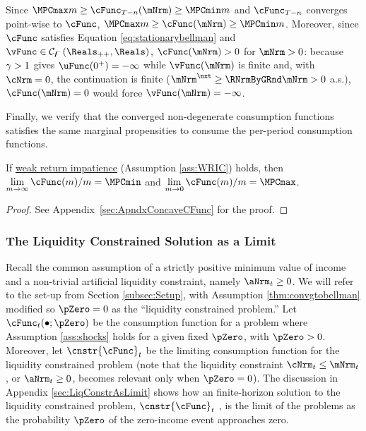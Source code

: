 \documentclass[\econtexRoot/BufferStockTheory]{subfiles}
\begin{document}
\begin{remark}\label{remark:cStatStrctPos}
Since $\MPCmax m \geq \cFunc_{T-n}(\mNrm)\geq \MPCmin m$ and $\cFunc_{T-n}$ converges point-wise to $\cFunc$, $\MPCmax m \geq \cFunc(\mNrm)\geq \MPCmin m$. Moreover, since $\cFunc$ satisfies Equation \eqref{eq:stationarybellman} and $\vFunc \in \mathcal{C}_{\boundFunc }\left(\Reals_{++},\Reals\right)$, $\cFunc(\mNrm)>0$ for $\mNrm>0$: because $\gamma>1$ gives $\uFunc(0^{+})=-\infty$ while $\vFunc(\mNrm)$ is finite and, with $\cNrm=0$, the continuation is finite ($\mNrm^{\nxt}\geq\RNrmByGRnd\mNrm>0$ a.s.), $\cFunc(\mNrm)=0$ would force $\vFunc(\mNrm)=-\infty$.
\end{remark}

Finally, we verify that the converged non-degenerate consumption functions satisfies the same marginal propensities to consume the per-period consumption functions.

\begin{lemma}\label{lemma:MPCBoundsConvg}
If \hyperlink{WRIC}{weak return impatience} (Assumption \ref{ass:WRIC}) holds, then $\lim\limits_{m\rightarrow \infty} \cFunc (m)/m =\MPCmin$ and $\lim\limits_{m\rightarrow 0} \cFunc (m)/m =\MPCmax$.

\end{lemma}
\begin{proof}\let\qed\relax
See Appendix~\ref{sec:ApndxConcaveCFunc} for the proof.

\end{proof}


\hypertarget{The-Liquidity-Constrained-Solution-as-a-Limit}{}
\subsubsection{The Liquidity Constrained Solution as a Limit}\label{subsubsec:deatonIsLimit}

Recall the common assumption \citep{deatonLiqConstr,aiyagari:ge, lsIncFluct, mstIncFluct} of a strictly positive minimum value of income and a non-trivial artificial liquidity constraint, namely $\aNrm_{t}\geq 0$.
We will refer to the set-up from Section \ref{subsec:Setup}, with Assumption \ref{thm:convgtobellman} modified so $\pZero=0$ as the ``liquidity constrained problem.'' Let $\cFunc_{t}(\bullet;\pZero)$ be the consumption function for a problem where Assumption \ref{ass:shocks} holds for a given fixed $\pZero$, with $\pZero>0$.
Moreover, let $\cnstr{\cFunc}_{t}$ be the limiting consumption function for the liquidity constrained problem (note that the liquidity constraint $\cNrm_{t}\leq \mNrm_{t}$, or $\aNrm_{t}\geq 0$, becomes relevant only when $\pZero= 0$).
The discussion in Appendix \ref{sec:LiqConstrAsLimit} shows how an finite-horizon solution to the liquidity constrained problem, $\cnstr{\cFunc}_{t}$ , is the limit of the problems as the probability $\pZero$ of the zero-income event approaches zero.
\end{document}
